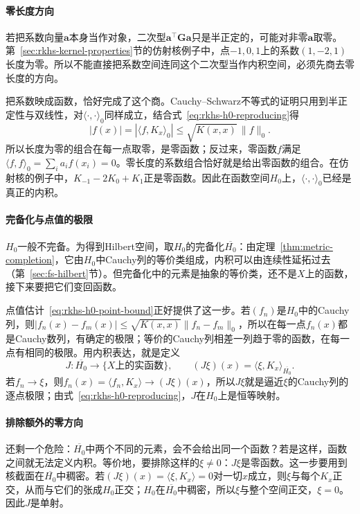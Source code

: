 \paragraph{零长度方向}

若把系数向量$\bm a$本身当作对象，二次型$\bm a^{\top}\bm G\bm a$只是半正定的，可能对非零$\bm a$取零。第~\ref{sec:rkhs-kernel-properties}节的仿射核例子中，点$-1,0,1$上的系数$(1,-2,1)$长度为零。所以不能直接把系数空间连同这个二次型当作内积空间，必须先商去零长度的方向。

把系数映成函数，恰好完成了这个商。Cauchy--Schwarz不等式的证明只用到半正定性与双线性，对$\langle\cdot,\cdot\rangle_0$同样成立，结合式~\eqref{eq:rkhs-h0-reproducing}得
\begin{equation}
|f(x)|=|\langle f,K_x\rangle_0|\le\sqrt{K(x,x)}\,\|f\|_0 .
\label{eq:rkhs-h0-point-bound}
\end{equation}
所以长度为零的组合在每一点取零，是零函数；反过来，零函数$f$满足$\langle f,f\rangle_0=\sum_ia_if(x_i)=0$。零长度的系数组合恰好就是给出零函数的组合。在仿射核的例子中，$K_{-1}-2K_0+K_1$正是零函数。因此在函数空间$H_0$上，$\langle\cdot,\cdot\rangle_0$已经是真正的内积。

\paragraph{完备化与点值的极限}

$H_0$一般不完备。为得到Hilbert空间，取$H_0$的完备化$\overline{H_0}$：由定理~\ref{thm:metric-completion}，它由$H_0$中Cauchy列的等价类组成，内积可以由连续性延拓过去（第~\ref{sec:fs-hilbert}节）。但完备化中的元素是抽象的等价类，还不是$X$上的函数，接下来要把它们变回函数。

点值估计~\eqref{eq:rkhs-h0-point-bound}正好提供了这一步。若$(f_n)$是$H_0$中的Cauchy列，则$|f_n(x)-f_m(x)|\le\sqrt{K(x,x)}\|f_n-f_m\|_0$，所以在每一点$f_n(x)$都是Cauchy数列，有确定的极限；等价的Cauchy列相差一列趋于零的函数，在每一点有相同的极限。用内积表达，就是定义
\[
J:\overline{H_0}\to\{X\text{上的实函数}\},\qquad (J\xi)(x)=\langle\xi,K_x\rangle_{\overline{H_0}} .
\]
若$f_n\to\xi$，则$f_n(x)=\langle f_n,K_x\rangle\to(J\xi)(x)$，所以$J\xi$就是逼近$\xi$的Cauchy列的逐点极限；由式~\eqref{eq:rkhs-h0-reproducing}，$J$在$H_0$上是恒等映射。

\paragraph{排除额外的零方向}

还剩一个危险：$\overline{H_0}$中两个不同的元素，会不会给出同一个函数？若是这样，函数之间就无法定义内积。等价地，要排除这样的$\xi\neq0$：$J\xi$是零函数。这一步要用到核截面在$\overline{H_0}$中稠密。若$(J\xi)(x)=\langle\xi,K_x\rangle=0$对一切$x$成立，则$\xi$与每个$K_x$正交，从而与它们的张成$H_0$正交；$H_0$在$\overline{H_0}$中稠密，所以$\xi$与整个空间正交，$\xi=0$。因此$J$是单射。

